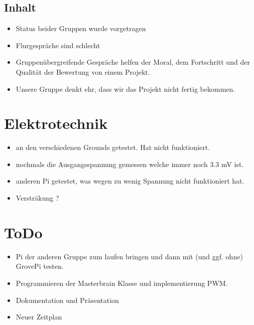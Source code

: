 \documentclass{article}
\begin{document}
\subsection{Inhalt}

\begin{itemize}

\item Status beider Gruppen wurde vorgetragen

\item Flurgespr\"{a}che sind schlecht

\item Gruppen\"{u}bergreifende Gespr\"{a}che helfen der Moral, dem Fortschritt und der Qualit\"{a}t der Bewertung von einem Projekt.

\item Unsere Gruppe denkt ehr, dass wir das Projekt nicht fertig bekommen.

\end{itemize}

\section{Elektrotechnik}

\begin{itemize}

\item an den verschiedenen Grounds getestet. Hat nicht funktioniert.

\item nochmals die Ausgangsspannung gemessen welche immer noch 3.3 mV ist.

\item anderen Pi getestet, was wegen zu wenig Spannung nicht funktioniert hat.

\item Verstr\"{a}kung ?

\end{itemize}

\section{ToDo}

\begin{itemize}

\item Pi der anderen Gruppe zum laufen bringen und dann mit (und ggf. ohne) GrovePi testen.

\item Programmieren der Masterbrain Klasse und implementierung PWM.

\item Dokumentation und Pr\"{a}sentation

\item Neuer Zeitplan

\end{itemize}
\end{document}
